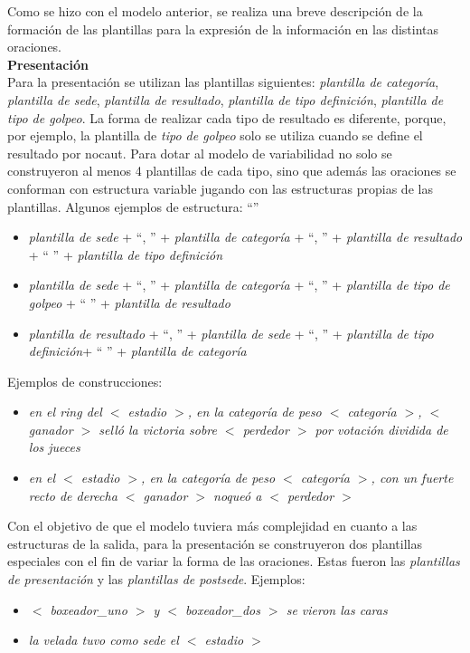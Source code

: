     Como se hizo con el modelo anterior, se realiza una breve descripción de la formación de las plantillas para la expresión de la información en las distintas oraciones.\\

    \textbf{Presentación}\\

    Para la presentación se utilizan las plantillas siguientes: \textit{plantilla de categoría}, \textit{plantilla de sede}, 
\textit{plantilla de resultado}, \textit{plantilla de tipo definición}, \textit{plantilla de tipo de golpeo}. La forma de realizar cada tipo de resultado es diferente, porque, 
por ejemplo, la plantilla de \textit{tipo de golpeo} solo se utiliza cuando se define el resultado por nocaut. Para dotar 
al modelo de variabilidad no solo se construyeron al menos 4 plantillas de cada tipo, sino que además las oraciones se conforman 
con estructura variable jugando con las estructuras propias de las plantillas.
    Algunos ejemplos de estructura:  “”
    \begin{itemize}
        \item \textit{plantilla de sede} + “, ” + \textit{plantilla de categoría} + “, ” + \textit{plantilla de resultado} + “ ” + \textit{plantilla de tipo definición}
        \item \textit{plantilla de sede} + “, ” + \textit{plantilla de categoría} + “, ” + \textit{plantilla de tipo de golpeo} + “ ” + \textit{plantilla de resultado}
        \item \textit{plantilla de resultado} + “, ” + \textit{plantilla de sede} + “, ” + \textit{plantilla de tipo definición}+ “ ” + \textit{plantilla de categoría}
    \end{itemize}

    Ejemplos de construcciones:
    \begin{itemize}
        \item \textit{ en el ring del $<$ estadio $>$, en la categoría de peso $<$ categoría $>$, $<$ ganador $>$ selló la victoria 
        sobre $<$ perdedor $>$ por votación dividida de los jueces}
        \item \textit{ en el $<$ estadio $>$, en la categoría de peso $<$ categoría $>$, con un fuerte recto de derecha $<$ ganador $>$ noqueó a $<$ perdedor $>$}
    \end{itemize}

    Con el objetivo de que el modelo tuviera más complejidad en cuanto a las estructuras de la salida, para la presentación se construyeron dos 
plantillas especiales con el fin de variar la forma de las oraciones. Estas fueron las \textit{plantillas de presentación} y las 
\textit{plantillas de postsede}.
    Ejemplos:
    \begin{itemize}
        \item \textit{$<$ boxeador\_uno $>$ y $<$ boxeador\_dos $>$ se vieron las caras}
        \item \textit{la velada tuvo como sede el $<$ estadio $>$}
    \end{itemize}

